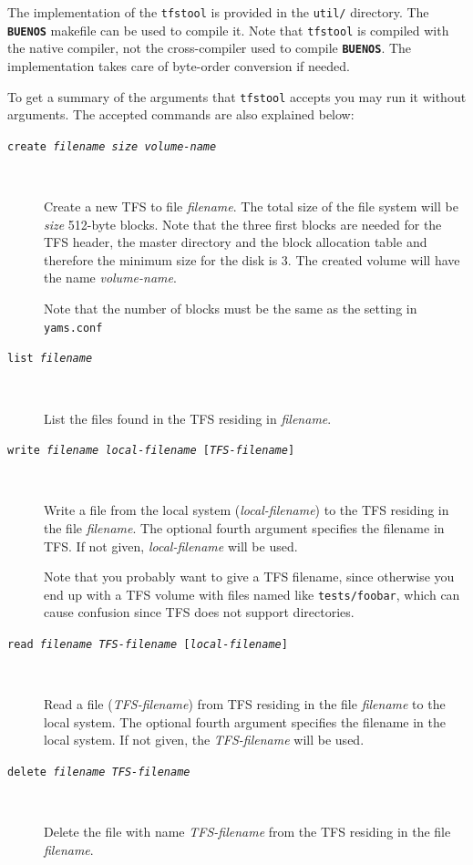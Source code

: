 \documentclass[twoside,a4paper]{report}
\newcommand{\buenos}{\texttt{\textbf{BUENOS}}}
\newcommand{\metavar}[1]{\textrm{\textsl{#1}}}
\begin{document}
The implementation of the \texttt{tfstool} is provided in the
\texttt{util/} directory. The \buenos{} makefile can be used to
compile it. Note that \texttt{tfstool} is compiled with the native compiler,
not the cross-compiler used to compile \buenos{}. The implementation
takes care of byte-order conversion if needed.

To get a summary of the arguments that \texttt{tfstool} accepts you
may run it without arguments. The accepted commands are also explained
below:

\begin{description}

\item[\texttt{create \metavar{filename} \metavar{size}
\metavar{volume-name}}]~

Create a new TFS to file \metavar{filename}. The total size of the
file system will be \metavar{size} 512-byte blocks. Note that the
three first blocks are needed for the TFS header, the master directory
and the block allocation table and therefore the minimum size for the
disk is 3. The created volume will have the name
\metavar{volume-name}.

Note that the number of blocks must be the same as the setting in
\texttt{yams.conf}

\item[\texttt{list \metavar{filename}}]~

List the files found in the TFS residing in \metavar{filename}.

\item[\texttt{write \metavar{filename} \metavar{local-filename}
[\metavar{TFS-filename}]}]~

Write a file from the local system (\metavar{local-filename}) to the
TFS residing in the file \metavar{filename}. The optional fourth
argument specifies the filename in TFS. If not given,
\metavar{local-filename} will be used.

Note that you probably want to give a TFS filename, since otherwise
you end up with a TFS volume with files named like
\texttt{tests/foobar}, which can cause confusion since TFS does not
support directories.

\item[\texttt{read \metavar{filename} \metavar{TFS-filename}
[\metavar{local-filename}]}]~

Read a file (\metavar{TFS-filename}) from TFS residing in the file
\metavar{filename} to the local system. The optional fourth argument
specifies the filename in the local system. If not given, the
\metavar{TFS-filename} will be used.

\item[\texttt{delete \metavar{filename} \metavar{TFS-filename}}]~

Delete the file with name \metavar{TFS-filename} from the TFS residing
in the file \metavar{filename}.

\end{description}
\end{document}
